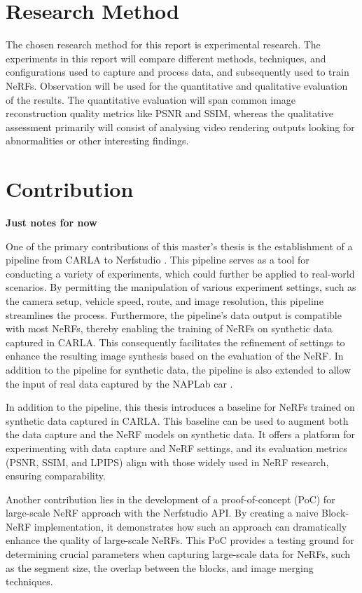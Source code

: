 \section{Research Method}
The chosen research method for this report is experimental research. The experiments in this report will compare different methods, techniques, and configurations used to capture and process data, and subsequently used to train NeRFs. Observation will be used for the quantitative and qualitative evaluation of the results. The quantitative evaluation will span common image reconstruction quality metrics like PSNR and SSIM, whereas the qualitative assessment primarily will consist of analysing video rendering outputs looking for abnormalities or other interesting findings.







\section{Contribution}
\textbf{Just notes for now}

One of the primary contributions of this master's thesis is the establishment of a pipeline from CARLA \cite{Dosovitskiy17} to Nerfstudio \cite{nerfstudio}. This pipeline serves as a tool for conducting a variety of experiments, which could further be applied to real-world scenarios. By permitting the manipulation of various experiment settings, such as the camera setup, vehicle speed, route, and image resolution, this pipeline streamlines the process. Furthermore, the pipeline's data output is compatible with most NeRFs, thereby enabling the training of NeRFs on synthetic data captured in CARLA. This consequently facilitates the refinement of settings to enhance the resulting image synthesis based on the evaluation of the NeRF. In addition to the pipeline for synthetic data, the pipeline is also extended to allow the input of real data captured by the NAPLab car \cite{naplab}.

In addition to the pipeline, this thesis introduces a baseline for NeRFs trained on synthetic data captured in CARLA. This baseline can be used to augment both the data capture and the NeRF models on synthetic data. It offers a platform for experimenting with data capture and NeRF settings, and its evaluation metrics (PSNR, SSIM, and LPIPS) align with those widely used in NeRF research, ensuring comparability.

Another contribution lies in the development of a proof-of-concept (PoC) for large-scale NeRF approach with the Nerfstudio API. By creating a naive Block-NeRF implementation, it demonstrates how such an approach can dramatically enhance the quality of large-scale NeRFs. This PoC provides a testing ground for determining crucial parameters when capturing large-scale data for NeRFs, such as the segment size, the overlap between the blocks, and image merging techniques.

